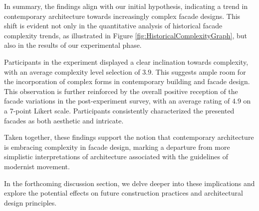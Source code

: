 
In summary, the findings align with our initial hypothesis, indicating a trend in contemporary architecture towards increasingly complex facade designs.
This shift is evident not only in the quantitative analysis of historical facade complexity trends, as illustrated in Figure \ref{fig:HistoricalComplexityGraph}, but also in the results of our experimental phase.

Participants in the experiment displayed a clear inclination towards complexity, with an average complexity level selection of \(3.9\).
This suggests ample room for the incorporation of complex forms in contemporary building and facade design.
This observation is further reinforced by the overall positive reception of the facade variations in the post-experiment survey, with an average rating of \(4.9\) on a 7-point Likert scale.
Participants consistently characterized the presented facades as both aesthetic and intricate.

Taken together, these findings support the notion that contemporary architecture is embracing complexity in facade design, marking a departure from more simplistic interpretations of architecture associated with the guidelines of modernist movement.

In the forthcoming discussion section, we delve deeper into these implications and explore the potential effects on future construction practices and architectural design principles.

